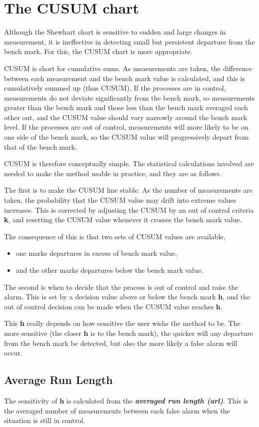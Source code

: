 \documentclass[12pt]{article}
\begin{document}
\tableofcontents
\section{The CUSUM chart}

Although the Shewhart chart is sensitive to sudden and large changes in measurement, it is ineffective in detecting small but persistent departure from the bench mark. For this, the CUSUM chart is more appropriate.

CUSUM is short for cumulative sums. As measurements are taken, the difference between each measurement and the bench mark value is calculated, and this is cumulatively summed up (thus CUSUM). If the processes are in control, measurements do not deviate significantly from the bench mark, so measurements greater than the bench mark and those less than the bench mark averaged each other out, and the CUSUM value should vary narrowly around the bench mark level. If the processes are out of control, measurements will more likely to be on one side of the bench mark, so the CUSUM value will progressively depart from that of the bench mark.

CUSUM is therefore conceptually simple. The statistical calculations involved are needed to make the method usable in practice, and they are as follows.

The first is to make the CUSUM line stable. As the number of measurements are taken, the probability that the CUSUM value may drift into extreme values increases. This is corrected by adjusting the CUSUM by an out of control criteria \textbf{k}, and resetting the CUSUM value whenever it crosses the bench mark value.

The consequence of this is that two sets of CUSUM values are available, 
\begin{itemize}
\item one marks departures in excess of bench mark value, 
\item and the other marks departures below the bench mark value.
\end{itemize}


The second is when to decide that the process is out of control and raise the alarm. This is set by a decision value above or below the bench mark \textbf{h}, and the out of control decision can be made when the CUSUM value reaches \textbf{h}.


This \textbf{h} really depends on how sensitive the user wishs the method to be. The more sensitive (the closer \textbf{h} is to the bench mark), the quicker will any departure from the bench mark be detected, but also the more likely a false alarm will occur.
\subsection{Average Run Length}
The sensitivity of \textbf{h} is calculated from the \textit{\textbf{averaged run length (arl)}}. This is the averaged number of measurements between each false alarm when the situation is still in control.
\end{document}
